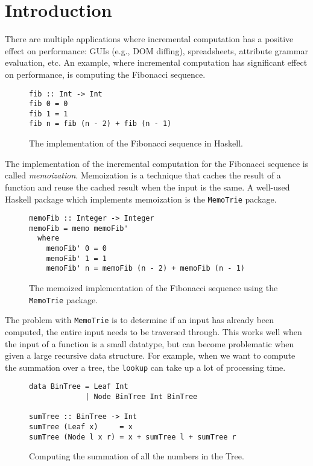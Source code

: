 \chapter{Introduction}

There are multiple applications where incremental computation has a positive effect on performance: GUIs (e.g., DOM diffing), spreadsheets, attribute grammar evaluation, etc.  An example, where incremental computation has significant effect on performance, is computing the Fibonacci sequence.

\begin{figure}[H]
\captionsetup{justification=justified,singlelinecheck=false,margin=0cm}
\begin{verbatim}
fib :: Int -> Int
fib 0 = 0
fib 1 = 1
fib n = fib (n - 2) + fib (n - 1)
\end{verbatim}
\caption{The implementation of the Fibonacci sequence in Haskell.}
\label{fig-fib-alg}
\end{figure}

The implementation of the incremental computation for the Fibonacci sequence is called \textit{memoization}. Memoization is a technique that caches the result of a function and reuse the cached result when the input is the same. A well-used Haskell package which implements memoization is the \texttt{MemoTrie} package\cite*{hackage2022memotrie}.

\begin{figure}[H]
\captionsetup{justification=justified,singlelinecheck=false,margin=0cm}
\begin{verbatim}
memoFib :: Integer -> Integer
memoFib = memo memoFib'
  where
    memoFib' 0 = 0
    memoFib' 1 = 1
    memoFib' n = memoFib (n - 2) + memoFib (n - 1)
\end{verbatim}
\caption{The memoized implementation\cite*{memotrie2022fibonacci} of the Fibonacci sequence using the \texttt{MemoTrie} package.}
\label{fig-mem-fib-alg}
\end{figure}

The problem with \texttt{MemoTrie} is to determine if an input has already been computed, the entire input needs to be traversed through. This works well when the input of a function is a small datatype, but can become problematic when given a large recursive data structure. For example, when we want to compute the summation over a tree, the \texttt{lookup} can take up a lot of processing time. 

\begin{figure}[H]
\captionsetup{justification=justified,singlelinecheck=false,margin=0cm}
\begin{verbatim}
data BinTree = Leaf Int
             | Node BinTree Int BinTree

sumTree :: BinTree -> Int
sumTree (Leaf x)     = x
sumTree (Node l x r) = x + sumTree l + sumTree r
\end{verbatim}
\caption{Computing the summation of all the numbers in the Tree.}
\label{fig-bin-tree}
\end{figure}

